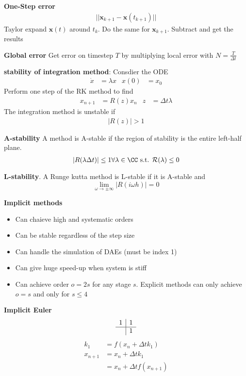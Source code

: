 \textbf{One-Step error}
\begin{align*}
    ||\bm{x}_{k+1}-\bm{x}(t_{k+1})||
\end{align*}
Taylor expand \(\bm{x}(t)\) around \(t_k\). Do the same for \(\bm{x}_{k+1}\). Subtract and get the results
\newline

\textbf{Global error}
Get error on timestep \(T\) by multiplying local error with \(N=\frac{T}{\Delta t}\)
\newline

\textbf{stability of integration method}: Consdier the ODE
\begin{align*}
    \dot{x}&=\lambda x & x(0) &= x_0
\end{align*}
Perform one step of the RK method to find
\begin{align*}
    x_{n+1} &= R(z)x_n & z &= \Delta t \lambda
\end{align*}
The integration method is unstable if
\begin{align*}
    |R(z)| > 1
\end{align*}

\textbf{A-stability}
A method is A-stable if the region of stability is the entire left-half plane.
\begin{align*}
    |R(\lambda\Delta t)|\leq 1 \forall \lambda \in \CC \textrm{ s.t. } \mathcal{R}(\lambda) \leq 0
\end{align*}

\textbf{L-stability}.
A Runge kutta method is L-stable if it is A-stable and
\[\lim_{\omega \rightarrow \pm \infty}|R(i\omega h)|= 0\]

\textbf{Implicit methods}
\begin{itemize}
    \item Can chaieve high and systematic orders
    \item Can be stable regardless of the step size 
    \item Can handle the simulation of DAEs (must be index 1)
    \item Can give huge speed-up when system is stiff
    \item Can achieve order \(o=2s\) for any stage \(s\). Explicit methods can only achieve \(o=s\) and only for \(s\leq4\)
\end{itemize}

\textbf{Implicit Euler}
\begin{align*}
\begin{array}{c|cc}
    1 & 1\\ \hline
     & 1
\end{array}
\end{align*}
\begin{align*}
    k_1 &= f(x_n + \Delta t k_1) \\
    x_{n+1} &= x_n + \Delta t k_1 \\
    &= x_n + \Delta t f(x_{n+1})
\end{align*}


